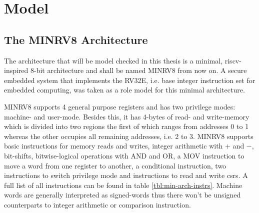 \section{Model}
\label{sec:model}


\subsection{The MINRV8 Architecture}
\label{sec:minrv8}

The architecture that will be model checked in this thesis is a minimal, \gls{riscv}-inspired 8-bit architecture and shall be named MINRV8 from now on.
A secure embedded system that implements the RV32E, i.e. base integer instruction set for embedded computing, was taken as a role model for this minimal architecture.

MINRV8 supports 4 general purpose registers and has two privilege modes: machine- and user-mode.
Besides this, it has 4-bytes of read- and write-memory which is divided into two regions the first of which ranges from addresses 0 to 1 whereas the other occupies all remaining addresses, i.e. 2 to 3.
MINRV8 supports basic instructions for memory reads and writes, integer arithmetic with $ + $ and $ - $, bit-shifts, bitwise-logical operations with AND and OR, a MOV instruction to move a word from one register to another, a conditional instruction, two instructions to switch privilege mode and instructions to read and write \glspl{csr}.
A full list of all instructions can be found in table \ref{tbl:min-arch-instrs}.
Machine words are generally interpreted as signed-words thus there won't be unsigned counterparts to integer arithmetic or comparison instruction.

